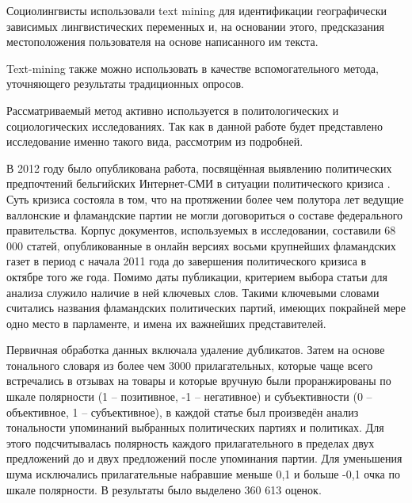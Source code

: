 Социолингвисты использовали text mining для идентификации географически зависимых лингвистических переменных и, на основании этого, предсказания местоположения пользователя на основе написанного им текста\cite{geographic_lexical_variation}.

Text-mining также можно использовать в качестве вспомогательного метода, уточняющего результаты традиционных опросов\cite{tweets_to_polls}.

Рассматриваемый метод активно используется в политологических и социологических исследованиях. Так как в данной работе будет представлено исследование именно такого вида, рассмотрим из подробней.

В 2012 году было опубликована работа, посвящённая выявлению политических предпочтений бельгийских Интернет-СМИ в ситуации политического кризиса \cite{MediaCoverage2012}. Суть кризиса состояла в том, что на протяжении более чем полутора лет ведущие валлонские и фламандские партии не могли договориться о составе федерального правительства. Корпус документов, используемых в исследовании, составили 68 000 статей, опубликованные в онлайн версиях восьми крупнейших фламандских газет в период с начала 2011 года до завершения политического кризиса в октябре того же года. Помимо даты публикации, критерием выбора статьи для анализа служило наличие в ней ключевых слов. Такими ключевыми словами считались названия фламандских политических партий, имеющих покрайней мере одно место в парламенте, и имена их важнейших представителей.

Первичная обработка данных включала удаление дубликатов. Затем на основе тонального словаря из более чем 3000 прилагательных, которые чаще всего встречались в отзывах на товары и которые вручную были проранжированы по шкале полярности (1 -- позитивное, -1 -- негативное) и субъективности (0 -- объективное, 1 -- субъективное), в каждой статье был произведён анализ тональности упоминаний выбранных  политических партиях и политиках. Для этого подсчитывалась полярность каждого прилагательного в пределах двух предложений до и двух предложений после упоминания партии. Для уменьшения шума исключались прилагательные набравшие меньше 0,1 и больше -0,1 очка по шкале полярности. В результаты было выделено 360 613 оценок.

